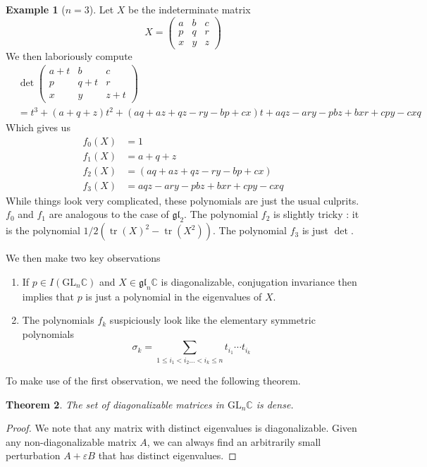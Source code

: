 \documentclass[psamsfonts, 12pt]{amsart}
\newtheorem{thm}{Theorem}[section]
\theoremstyle{definition}
\newtheorem{exmp}[thm]{Example}
\theoremstyle{remark}
\newcommand{\C}{\mathbb{C}}
\newcommand{\GL}{\mathrm{GL}}
\newcommand{\gl}{\mathfrak{gl}}
\DeclareMathOperator{\tr}{tr}
\begin{document}
%
\begin{exmp}[$n=3$]
Let $X$ be the indeterminate matrix
\[
X = \begin{pmatrix}
a & b & c \\
p & q & r \\
x & y & z
\end{pmatrix}
\]
We then laboriously compute
\begin{align*}
  &\det \begin{pmatrix}
  a+t & b & c \\
  p & q+t & r \\
  x & y & z+t
  \end{pmatrix} \\[5pt]
  &=  t^3 + (a+q+z)t^2 + (aq+az+qz-ry-bp+cx)t + aqz - ary - pbz + bxr + cpy - cxq
\end{align*}
Which gives us
\begin{align*}
f_0(X) &= 1 \\
f_1(X) &= a+q+z \\
f_2(X) &= (aq+az+qz-ry-bp+cx) \\
f_3(X) &= aqz - ary - pbz + bxr + cpy - cxq
\end{align*}
While things look very complicated, these polynomials are just the usual culprits.
$f_0$ and $f_1$ are analogous to the case of $\gl_2$. The polynomial $f_2$ is slightly
tricky : it is the polynomial $1/2(\tr(X)^2 -\tr(X^2))$. The polynomial $f_3$ is just
$\det$.
\end{exmp}
%
We then make two key observations
\begin{enumerate}
  \item If $p \in I(\GL_n\C)$ and $X \in \gl_n\C$ is diagonalizable, conjugation
  invariance then implies that $p$ is just a polynomial in the eigenvalues of $X$.
  \item The polynomials $f_k$ suspiciously look like the elementary symmetric polynomials
  \[
  \sigma_k = \sum_{1 \leq i_1 < i_2 \ldots < i_k \leq n} t_{i_1}\cdots t_{i_k}
  \]
\end{enumerate}
%
To make use of the first observation, we need the following theorem.
%
\begin{thm}
The set of diagonalizable matrices in $\GL_n\C$ is dense.
\end{thm}
%
\begin{proof}
We note that any matrix with distinct eigenvalues is diagonalizable. Given any
non-diagonalizable matrix $A$, we can always find an arbitrarily small perturbation
$A + \varepsilon B$ that has distinct eigenvalues.
\end{proof}
\end{document}
